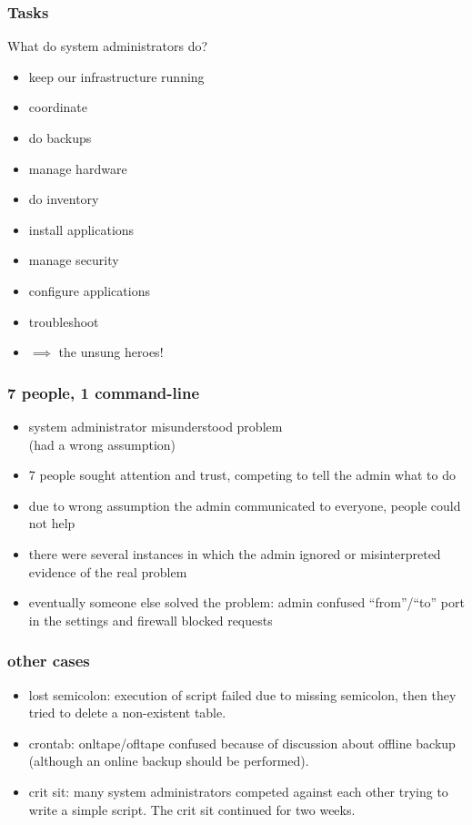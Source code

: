 \begin{frame}
	\frametitle{Tasks}

	What do system administrators do?

	\begin{itemize}[<+-| alert@+>]
	\item keep our infrastructure running
	\item coordinate
	\item do backups
	\item manage hardware
	\item do inventory
	\item install applications
	\item manage security
	\item configure applications
	\item troubleshoot
	\item $\implies$ the unsung heroes!
	\end{itemize}
\end{frame}


\begin{frame}
	\frametitle{7 people, 1 command-line~\cite{barrett2004field}}

	\begin{itemize}[<+-| alert@+>]
	\item system administrator misunderstood problem \\ (had a wrong assumption)
	\item 7 people sought attention and trust, competing to tell the admin what to do
	\item due to wrong assumption the admin communicated to everyone, people could not help
	\item there were several instances in which the admin ignored or misinterpreted evidence of the real problem
	\item eventually someone else solved the problem: admin confused ``from''/``to'' port in the settings and firewall blocked requests
	\end{itemize}
\end{frame}

\begin{frame}
	\frametitle{other cases~\cite{barrett2004field}}

	\begin{itemize}[<+-| alert@+>]
	\item lost semicolon: execution of script failed due to missing semicolon, then they tried to delete a non-existent table.
	\item crontab: onltape/ofltape confused because of discussion about offline backup (although an online backup should be performed).
	\item crit sit: many system administrators competed against each other trying to write a simple script. The crit sit continued for two weeks.
	\end{itemize}
\end{frame}


